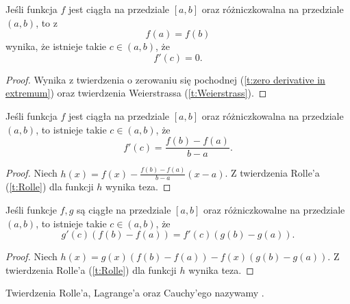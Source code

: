 \begin{theorem}[Rolle'a]
    \label{t:Rolle}
    Jeśli funkcja $f$ jest ciągła na przedziale $[a, b]$ oraz różniczkowalna na przedziale $(a, b)$, to z
    \[ f(a) = f(b) \]
    wynika, że istnieje takie $c \in (a, b)$, że
    \[ f'(c) = 0. \]
\end{theorem}
\begin{proof}
    Wynika z twierdzenia o zerowaniu się pochodnej (\ref{t:zero derivative in extremum}) oraz twierdzenia Weierstrassa (\ref{t:Weierstrass}).
\end{proof}

\begin{theorem}[Lagrange'a]
    Jeśli funkcja $f$ jest ciągła na przedziale $[a, b]$ oraz różniczkowalna na przedziale $(a, b)$, to istnieje takie $c \in (a, b)$, że
    \[ f'(c) = \frac{f(b) - f(a)}{b - a}. \]
\end{theorem}
\begin{proof}
    Niech $h(x) = f(x) - \frac{f(b) - f(a)}{b - a}(x - a)$. Z twierdzenia Rolle'a (\ref{t:Rolle}) dla funkcji $h$ wynika teza.
\end{proof}

\begin{theorem}
    Jeśli funkcje $f, g$ są ciągłe na przedziale $[a, b]$ oraz różniczkowalne na przedziale $(a, b)$, to istnieje takie $c \in (a, b)$, że
    \[ g'(c) (f(b) - f(a)) = f'(c) (g(b) - g(a)). \]
\end{theorem}
\begin{proof}
    Niech $h(x) = g(x)(f(b) - f(a)) - f(x)(g(b) - g(a))$. Z twierdzenia Rolle'a (\ref{t:Rolle}) dla funkcji $h$ wynika teza.
\end{proof}

Twierdzenia Rolle'a, Lagrange'a oraz Cauchy'ego nazywamy .


